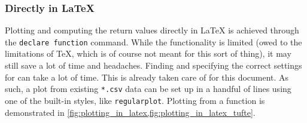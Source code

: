 \subsubsection{Directly in \LaTeX{}}
Plotting and computing the return values directly in \LaTeX{} is achieved through
the \texttt{declare function} command.
While the functionality is limited (owed to the limitations of \TeX{}, which is
of course not meant for this sort of thing),
it may still save a lot of time and headaches.
Finding and specifying the correct settings for  can take
a lot of time.
This is already taken care of for this document.
As such, a plot from existing \texttt{*.csv} data can be set up in a handful of
lines using one of the built-in styles, like \texttt{regularplot}.
Plotting from a  function is demonstrated in
\cref{fig:plotting_in_latex,fig:plotting_in_latex_tufte}.

